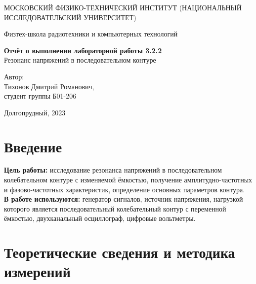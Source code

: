 \documentclass[a4paper, 12pt]{article}
\begin{document}
    \begin{titlepage}
	\begin{center}
            {\large МОСКОВСКИЙ ФИЗИКО-ТЕХНИЧЕСКИЙ ИНСТИТУТ (НАЦИОНАЛЬНЫЙ ИССЛЕДОВАТЕЛЬСКИЙ УНИВЕРСИТЕТ)}
	\end{center}
 
	\begin{center}
		{\large Физтех-школа радиотехники и компьютерных технологий}
	\end{center}
	
	\vspace{8cm}
	{\LARGE
		\begin{center}
                {\bf Отчёт о выполнении лабораторной работы 3.2.2}\\
                Резонанс напряжений в последовательном контуре
		\end{center}
	}
	\vspace{5cm}
	\begin{flushright}
		{\Large Автор:\\ Тихонов Дмитрий Романович, \\
			\vspace{0.2cm}
			студент группы Б01-206}
	\end{flushright}
	\vspace{5cm}
	\begin{center}
		\Large Долгопрудный, 2023
	\end{center}
    \end{titlepage}


    \section{Введение}

    \noindent \textbf{Цель работы:} исследование резонанса напряжений в последовательном колебательном контуре с изменяемой ёмкостью, получение амплитудно-частотных и фазово-частотных характеристик, определение основных параметров контура. \\

    \noindent \textbf{В работе используются:} генератор сигналов, источник напряжения, нагрузкой которого является последовательный колебательный контур с переменной ёмкостью, двухканальный осциллограф, цифровые вольтметры.
    
    \section{Теоретические сведения и методика измерений}
\end{document}

